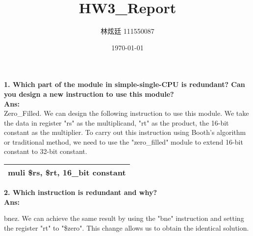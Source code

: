 \documentclass[a4paper, 12pt]{article}
\begin{document}
\title{HW3\_Report}
\author{林炫廷 111550087}
\date{\today}
\maketitle
{\bf1. Which part of the module in simple-single-CPU is redundant? Can you design a new instruction to use this module?}\\
{\bf Ans: }\\
Zero\_Filled. We can design the following instruction to use this module.
We take the data in register "rs" as the multiplicand, "rt" as the product, the 16-bit constant as the multiplier.
To carry out this instruction using Booth's algorithm or traditional method, we need to use the "zero\_filled" module
to extend 16-bit constant to 32-bit constant.
\begin{center}
    \begin{tabular}{|c|}
        \hline
        muli	\$rs, \$rt, 16\_bit constant \\
        \hline
    \end{tabular}
\end{center}\par
{\bf 2. Which instruction is redundant and why? }\\
{\bf Ans: }\par
bnez. We can achieve the same result by using the "bne" instruction and setting the register "rt" to "\$zero".
This change allows us to obtain the identical solution.
\end{document}
